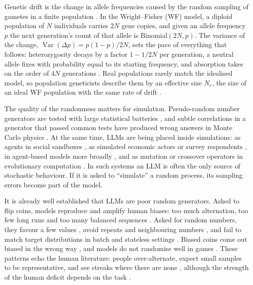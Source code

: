 \documentclass[11pt,a4paper]{article}
\newcommand{\Ne}{N_e}
\newcommand{\Var}{\operatorname{Var}}
\begin{document}
Genetic drift is the change in allele frequencies caused by the random sampling of gametes in a finite population \citep{wright1931evolution,fisher1930genetical}.
In the Wright--Fisher (WF) model, a diploid population of $N$ individuals carries $2N$ gene copies, and given an allele frequency $p$ the next generation's count of that allele is Binomial$(2N,p)$.
The variance of the change, $\Var(\Delta p)=p(1-p)/2N$, sets the pace of everything that follows: heterozygosity decays by a factor $1-1/2N$ per generation, a neutral allele fixes with probability equal to its starting frequency, and absorption takes on the order of $4N$ generations \citep{kimura1962probability,kimura1969average,ewens2004mathematical}.
Real populations rarely match the idealised model, so population geneticists describe them by an effective size $\Ne$, the size of an ideal WF population with the same rate of drift \citep{crow1970introduction,charlesworth2009effective}.

The quality of the randomness matters for simulation.
Pseudo-random number generators are tested with large statistical batteries \citep{lecuyer2007testu01}, and subtle correlations in a generator that passed common tests have produced wrong answers in Monte Carlo physics \citep{ferrenberg1992monte}.
At the same time, LLMs are being placed inside simulations: as agents in social sandboxes \citep{park2023generative}, as simulated economic actors or survey respondents \citep{horton2023large,argyle2023out,aher2023using}, in agent-based models more broadly \citep{gao2024large}, and as mutation or crossover operators in evolutionary computation \citep{lehman2022evolution,meyerson2024language}.
In such systems an LLM is often the only source of stochastic behaviour.
If it is asked to ``simulate'' a random process, its sampling errors become part of the model.

It is already well established that LLMs are poor random generators.
Asked to flip coins, models reproduce and amplify human biases: too much alternation, too few long runs and too many balanced sequences \citep{koevering2024random}.
Asked for random numbers, they favour a few values \citep{zhang2024forcing,coronado2025deterministic}, avoid repeats and neighbouring numbers \citep{harrison2024comparison}, and fail to match target distributions in batch and stateless settings \citep{hopkins2023random,gu2025dice,zhao2026dice,gu2026stochasticity,karanjai2025randomness}.
Biased coins come out biased in the wrong way \citep{xiao2025flipping,gupta2025coinflips}, and models do not randomise well in games \citep{guo2025illusion,yang2025flipcoin}.
These patterns echo the human literature: people over-alternate, expect small samples to be representative, and see streaks where there are none \citep{wagenaar1972generation,tversky1971belief,gilovich1985hot,barhillel1991perception,falk1997making,rapoport1992generation}, although the strength of the human deficit depends on the task \citep{nickerson2002production}.
\end{document}

